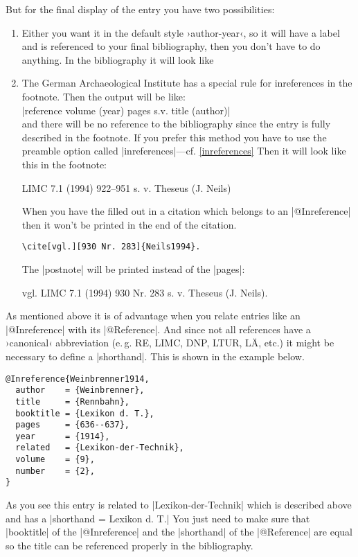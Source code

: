 \documentclass[a4paper,
10pt,
greek,
french,
spanish,
italian,
ngerman,
english
]{ltxdoc}
\begin{document}
But for the final display of the entry  you have two possibilities:
 \begin{enumerate}
\item\label{inreference:a} 

Either you want it in the default style ›author-year‹, so it will have a label and is referenced 
to your final bibliography, then you don’t have to do anything.
In the bibliography it will look like

\item\label{inreference:b} 
The German Archaeological Institute has a special rule for inreferences in the footnote.
Then the output will be like:\\
|reference volume (year) pages s.v. title (author)| \\
and there will be no reference to the bibliography since the entry is fully described in the footnote.
 If you prefer this method you have to use the preamble option called  |inreferences|---cf. \cref{inreferences}
Then it will look like this in the footnote:
\begin{bsp}
LIMC 7.1 (1994) 922--951 s. v. Theseus (J. Neils)
\end{bsp}
When you have the  filled out in a citation which belongs to an |@Inreference| then it won’t be printed in the end of the citation.
\begin{lstlisting}
\cite[vgl.][930 Nr. 283]{Neils1994}.
\end{lstlisting}
The |postnote|  will be printed instead of the |pages|:
 \begin{bsp}
vgl. LIMC 7.1 (1994) 930 Nr. 283 s. v. Theseus (J. Neils).
 \end{bsp}
 
\end{enumerate}

As mentioned above it is of advantage when you relate entries like  an |@Inreference| with its |@Reference|. 
And since not all references have a ›canonical‹ abbreviation (e.\,g. RE, LIMC, DNP, LTUR, LÄ, etc.) it might be necessary to define a |shorthand|.
This is shown in the example below.
 
\begin{lstlisting}[style=bibentry,label=Weinbrenner1914,caption={{@}Inreference\{Weinbrenner1914,…\} }]
@Inreference{Weinbrenner1914,
  author    = {Weinbrenner},
  title     = {Rennbahn},
  booktitle = {Lexikon d. T.},
  pages     = {636--637},
  year      = {1914},
  related   = {Lexikon-der-Technik},
  volume    = {9},
  number    = {2},
}
\end{lstlisting}
As you see this entry is related to |Lexikon-der-Technik| which is described above and has a |shorthand = {Lexikon d. T.}|
You just need to make sure that  |booktitle| of the |@Inreference| and the |shorthand| of 
the  |@Reference| are equal so the title can be referenced properly in the bibliography.
\end{document}
